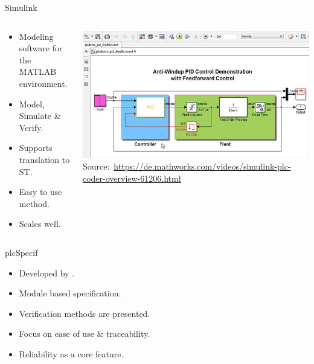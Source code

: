 \documentclass[18pt]{beamer}
\begin{document}
\begin{frame}{Simulink}
\begin{columns}
    \begin{column}{0.5\textwidth}
        \begin{itemize}
            \item Modeling software for the MATLAB environment.
            \item Model, Simulate \& Verify.
            \item Supports translation to ST.
            \item Easy to use method.
            \item Scales well.
        \end{itemize}
    \end{column}
    \begin{column}{0.5\textwidth}
        \includegraphics[width=\textwidth]{./figures/simulink.jpg}
       {\footnotesize  Source:~\url{https://de.mathworks.com/videos/simulink-plc-coder-overview-61206.html}}
    \end{column}
\end{columns}
\end{frame}

\begin{frame}{plcSpecif}
    \begin{itemize}
        \item Developed by \cite{7819191}.
        \item Module based specification.
        \item Verification methods are presented.
        \item Focus on ease of use \& traceability.
        \item Reliability as a core feature.
    \end{itemize}
\end{frame}
\end{document}
